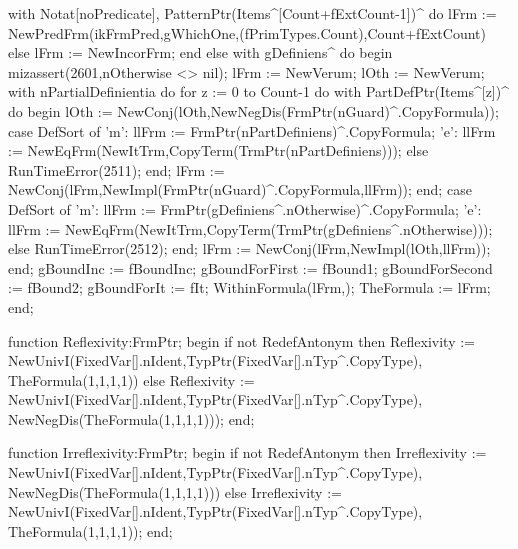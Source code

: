             with Notat[noPredicate], PatternPtr(Items^[Count+fExtCount-1])^ do
            lFrm := NewPredFrm(ikFrmPred,gWhichOne,(fPrimTypes.Count),Count+fExtCount)
         else lFrm := NewIncorFrm;
      end
      else
         with gDefiniens^ do
      begin
         mizassert(2601,nOtherwise <> nil);
         lFrm := NewVerum; lOth := NewVerum;
         with nPartialDefinientia do
            for z := 0 to Count-1 do
               with PartDefPtr(Items^[z])^ do
            begin
               lOth := NewConj(lOth,NewNegDis(FrmPtr(nGuard)^.CopyFormula));
               case DefSort of
                  'm': llFrm := FrmPtr(nPartDefiniens)^.CopyFormula;
                  'e': llFrm := NewEqFrm(NewItTrm,CopyTerm(TrmPtr(nPartDefiniens)));
               else RunTimeError(2511);
               end;
               lFrm := NewConj(lFrm,NewImpl(FrmPtr(nGuard)^.CopyFormula,llFrm));
            end;
         case DefSort of
            'm': llFrm := FrmPtr(gDefiniens^.nOtherwise)^.CopyFormula;
            'e': llFrm := NewEqFrm(NewItTrm,CopyTerm(TrmPtr(gDefiniens^.nOtherwise)));
         else RunTimeError(2512);
         end;
         lFrm := NewConj(lFrm,NewImpl(lOth,llFrm));
      end;
      gBoundInc := fBoundInc;
      gBoundForFirst := fBound1; gBoundForSecond := fBound2;
      gBoundForIt := fIt;
      WithinFormula(lFrm,);
      TheFormula := lFrm;
   end;
   
   function Reflexivity:FrmPtr;
   begin
      if not RedefAntonym then
         Reflexivity := 
            NewUnivI(FixedVar[].nIdent,TypPtr(FixedVar[].nTyp^.CopyType),
                     TheFormula(1,1,1,1))
      else Reflexivity := 
         NewUnivI(FixedVar[].nIdent,TypPtr(FixedVar[].nTyp^.CopyType),
                  NewNegDis(TheFormula(1,1,1,1)));
   end;
   
   function Irreflexivity:FrmPtr;
   begin
      if not RedefAntonym then
         Irreflexivity := 
            NewUnivI(FixedVar[].nIdent,TypPtr(FixedVar[].nTyp^.CopyType),
                     NewNegDis(TheFormula(1,1,1,1)))
      else Irreflexivity := 
         NewUnivI(FixedVar[].nIdent,TypPtr(FixedVar[].nTyp^.CopyType),
                  TheFormula(1,1,1,1));
   end;
   
